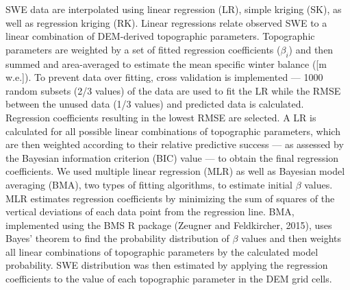 \documentclass[twocolumn,letterpaper]{igs}
\begin{document}
SWE data are interpolated using linear regression (LR), simple kriging (SK), as well as regression kriging (RK). Linear regressions relate observed SWE to a linear combination of DEM-derived topographic parameters. Topographic parameters are weighted by a set of fitted regression coefficients ($\beta_i$) and then summed and area-averaged to estimate the mean specific winter balance ([m w.e.]). To prevent data over fitting, cross validation is implemented --- 1000 random subsets (2/3 values) of the data are used to fit the LR while the RMSE between the unused data (1/3 values) and predicted data is calculated. Regression coefficients resulting in the lowest RMSE are selected. A LR is calculated for all possible linear combinations of topographic parameters, which are then weighted according to their relative predictive success --- as assessed by the Bayesian information criterion (BIC) value --- to obtain the final regression coefficients. We used multiple linear regression (MLR) as well as Bayesian model averaging (BMA), two types of fitting algorithms, to estimate initial $\beta$ values. MLR estimates regression coefficients by minimizing the sum of squares of the vertical deviations of each data point from the regression line. BMA, implemented using the BMS R package (Zeugner and Feldkircher, 2015), uses Bayes' theorem to find the probability distribution of $\beta$ values and then weights all linear combinations of topographic parameters by the calculated model probability. SWE distribution was then estimated by applying the regression coefficients to the value of each topographic parameter in the DEM grid cells. 
\end{document}
